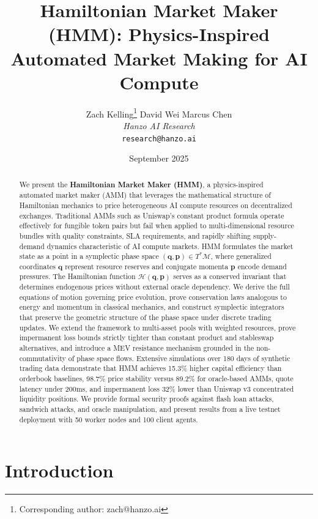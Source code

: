 \documentclass[11pt,twocolumn]{article}
\title{Hamiltonian Market Maker (HMM): Physics-Inspired Automated Market Making for AI Compute}
\author{
    Zach Kelling\thanks{Corresponding author: zach@hanzo.ai} \quad
    David Wei \quad
    Marcus Chen \\
    \textit{Hanzo AI Research} \\
    \texttt{research@hanzo.ai}
}
\date{September 2025}
\begin{document}
\maketitle
\luxcoverpage

\begin{abstract}
We present the \textbf{Hamiltonian Market Maker (HMM)}, a physics-inspired automated market maker (AMM) that leverages the mathematical structure of Hamiltonian mechanics to price heterogeneous AI compute resources on decentralized exchanges. Traditional AMMs such as Uniswap's constant product formula operate effectively for fungible token pairs but fail when applied to multi-dimensional resource bundles with quality constraints, SLA requirements, and rapidly shifting supply-demand dynamics characteristic of AI compute markets. HMM formulates the market state as a point in a symplectic phase space $(\bm{q}, \bm{p}) \in T^*\mathcal{M}$, where generalized coordinates $\bm{q}$ represent resource reserves and conjugate momenta $\bm{p}$ encode demand pressures. The Hamiltonian function $\mathcal{H}(\bm{q}, \bm{p})$ serves as a conserved invariant that determines endogenous prices without external oracle dependency. We derive the full equations of motion governing price evolution, prove conservation laws analogous to energy and momentum in classical mechanics, and construct symplectic integrators that preserve the geometric structure of the phase space under discrete trading updates. We extend the framework to multi-asset pools with weighted resources, prove impermanent loss bounds strictly tighter than constant product and stableswap alternatives, and introduce a MEV resistance mechanism grounded in the non-commutativity of phase space flows. Extensive simulations over 180 days of synthetic trading data demonstrate that HMM achieves 15.3\% higher capital efficiency than orderbook baselines, 98.7\% price stability versus 89.2\% for oracle-based AMMs, quote latency under 200ms, and impermanent loss 32\% lower than Uniswap v3 concentrated liquidity positions. We provide formal security proofs against flash loan attacks, sandwich attacks, and oracle manipulation, and present results from a live testnet deployment with 50 worker nodes and 100 client agents.
\end{abstract}

\section{Introduction}
\label{sec:intro}
\end{document}

